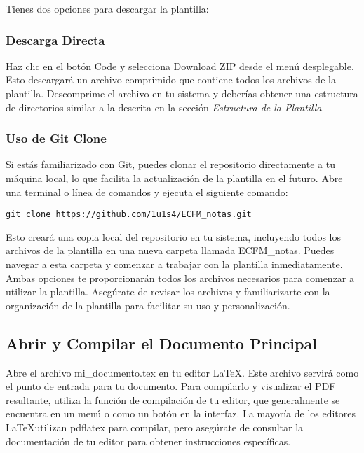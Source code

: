 \documentclass[11pt]{article}
\begin{document}
Tienes dos opciones para descargar la plantilla:

\subsubsection{Descarga Directa}

Haz clic en el botón Code y selecciona Download ZIP desde el menú desplegable. Esto descargará un archivo comprimido que contiene todos los archivos de la plantilla. Descomprime el archivo en tu sistema y deberías obtener una estructura de directorios similar a la descrita en la sección \textit{Estructura de la Plantilla}.

\subsubsection{Uso de Git Clone}

Si estás familiarizado con Git, puedes clonar el repositorio directamente a tu máquina local, lo que facilita la actualización de la plantilla en el futuro. Abre una terminal o línea de comandos y ejecuta el siguiente comando:

\begin{verbatim}
git clone https://github.com/1u1s4/ECFM_notas.git
\end{verbatim}

Esto creará una copia local del repositorio en tu sistema, incluyendo todos los archivos de la plantilla en una nueva carpeta llamada ECFM\_notas. Puedes navegar a esta carpeta y comenzar a trabajar con la plantilla inmediatamente.\\

Ambas opciones te proporcionarán todos los archivos necesarios para comenzar a utilizar la plantilla. Asegúrate de revisar los archivos y familiarizarte con la organización de la plantilla para facilitar su uso y personalización.

\subsection{Abrir y Compilar el Documento Principal}

Abre el archivo mi\_documento.tex en tu editor \LaTeX. Este archivo servirá como el punto de entrada para tu documento. Para compilarlo y visualizar el PDF resultante, utiliza la función de compilación de tu editor, que generalmente se encuentra en un menú o como un botón en la interfaz. La mayoría de los editores \LaTeX utilizan pdflatex para compilar, pero asegúrate de consultar la documentación de tu editor para obtener instrucciones específicas.
\end{document}
